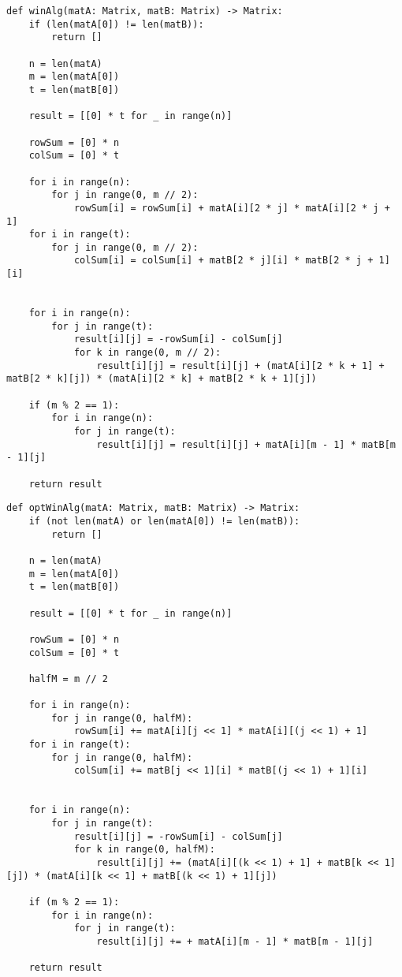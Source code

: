 \begin{center}
    \captionsetup{justification=raggedright,singlelinecheck=off}
    \begin{lstlisting}[label=lst:vin_alg,caption=Алгоритм Винограда умножения матриц]
def winAlg(matA: Matrix, matB: Matrix) -> Matrix:
	if (len(matA[0]) != len(matB)):
		return []
	
	n = len(matA)
	m = len(matA[0])
	t = len(matB[0])
	
	result = [[0] * t for _ in range(n)]
	
	rowSum = [0] * n
	colSum = [0] * t
	
	for i in range(n):
		for j in range(0, m // 2):
			rowSum[i] = rowSum[i] + matA[i][2 * j] * matA[i][2 * j + 1]
	for i in range(t):
		for j in range(0, m // 2):
			colSum[i] = colSum[i] + matB[2 * j][i] * matB[2 * j + 1][i]
	
	
	for i in range(n):
		for j in range(t):
			result[i][j] = -rowSum[i] - colSum[j]
			for k in range(0, m // 2):
				result[i][j] = result[i][j] + (matA[i][2 * k + 1] + matB[2 * k][j]) * (matA[i][2 * k] + matB[2 * k + 1][j])
	
	if (m % 2 == 1):
		for i in range(n):
			for j in range(t):
				result[i][j] = result[i][j] + matA[i][m - 1] * matB[m - 1][j]
	
	return result
\end{lstlisting}
\end{center}


\begin{center}
    \captionsetup{justification=raggedright,singlelinecheck=off}
    \begin{lstlisting}[label=lst:opt_vin_alg,caption=Оптимизированный алгоритм Винограда умножения матриц]
def optWinAlg(matA: Matrix, matB: Matrix) -> Matrix:
	if (not len(matA) or len(matA[0]) != len(matB)):
		return []
	
	n = len(matA)
	m = len(matA[0])
	t = len(matB[0])
	
	result = [[0] * t for _ in range(n)]
	
	rowSum = [0] * n
	colSum = [0] * t
	
	halfM = m // 2
	
	for i in range(n):
		for j in range(0, halfM):
			rowSum[i] += matA[i][j << 1] * matA[i][(j << 1) + 1]
	for i in range(t):
		for j in range(0, halfM):
			colSum[i] += matB[j << 1][i] * matB[(j << 1) + 1][i]
	
	
	for i in range(n):
		for j in range(t):
			result[i][j] = -rowSum[i] - colSum[j]
			for k in range(0, halfM):
				result[i][j] += (matA[i][(k << 1) + 1] + matB[k << 1][j]) * (matA[i][k << 1] + matB[(k << 1) + 1][j])
	
	if (m % 2 == 1):
		for i in range(n):
			for j in range(t):
				result[i][j] += + matA[i][m - 1] * matB[m - 1][j]
	
	return result
\end{lstlisting}
\end{center}


